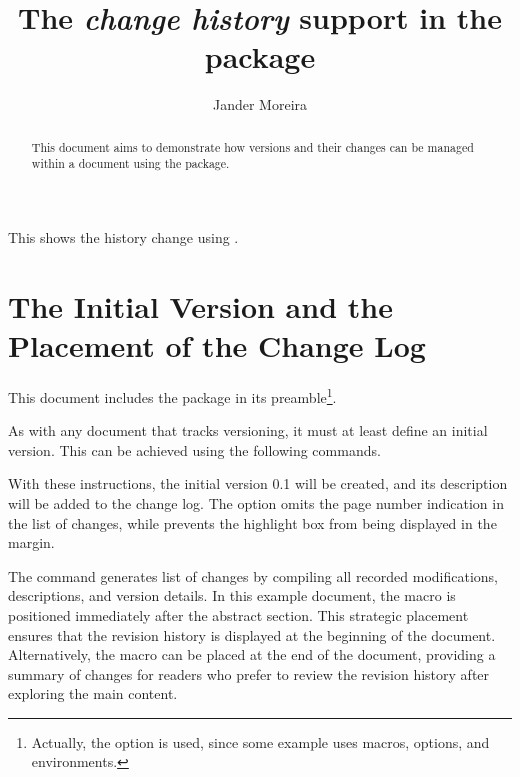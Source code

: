 \documentclass[a4paper, 11pt]{article}
\title{The \textit{change history} support in the \PackageName{packdoc} package}
\author{Jander Moreira}
\date{}
\begin{document}
\maketitle

\begin{abstract}
    This document aims to demonstrate how versions and their changes can be managed within a document using the  package.
\end{abstract}

\noindent This shows the history change using .

\PDPrintChanges


\section{The Initial Version and the Placement of the Change Log}

This document includes the  package in its preamble\footnote{Actually, the  option is used, since some example uses macros, options, and environments.}.

\begin{PDListing}
    \usepackage{packdoc}
\end{PDListing}

As with any document that tracks versioning, it must at least define an initial version. This can be achieved using the following commands.

%
\begin{PDListing}
\end{PDListing}

With these instructions, the initial version 0.1 will be created, and its description will be added to the change log. The  option omits the page number indication in the list of changes, while  prevents the highlight box from being displayed in the margin.

The  command generates list of changes by compiling all recorded modifications, descriptions, and version details. In this example document, the macro is positioned immediately after the abstract section. This strategic placement ensures that the revision history is displayed at the beginning of the document. Alternatively, the macro can be placed at the end of the document, providing a summary of changes for readers who prefer to review the revision history after exploring the main content.
\end{document}
